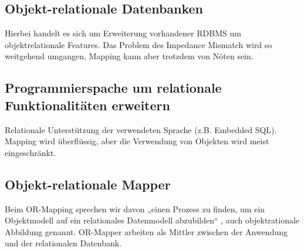 \subsection{Objekt-relationale Datenbanken}

Hierbei handelt es sich um Erweiterung vorhandener RDBMS um objektrelationale Features. Das Problem des Impedance Mismatch wird so weitgehend umgangen, Mapping kann aber trotzdem von Nöten sein.

\subsection{Programmierspache um relationale Funktionalitäten erweitern}

Relationale Unterstützung der verwendeten Sprache (z.B. Embedded SQL). Mapping wird überflüssig, aber die Verwendung von Objekten wird meist eingeschränkt.

\subsection{Objekt-relationale Mapper}

Beim OR-Mapping sprechen wir davon „einen Prozess zu finden, um ein Objektmodell auf ein relationales Datenmodell abzubilden“  , auch objektrationale Abbildung genannt. OR-Mapper arbeiten als Mittler zwischen der Anwendung und der relationalen Datenbank.
